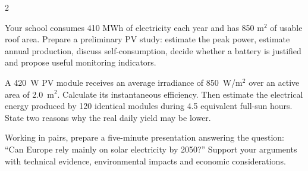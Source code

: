 \begin{multicols}{2}
\begin{challenge}
Your school consumes 410 MWh of electricity each year and has 850 m$^2$ of usable roof area. Prepare a preliminary PV study: estimate the peak power, estimate annual production, discuss self-consumption, decide whether a battery is justified and propose useful monitoring indicators.
\end{challenge}

\begin{applicationexercise}
A 420~W PV module receives an average irradiance of 850~W/m$^2$ over an active area of 2.0~m$^2$. Calculate its instantaneous efficiency. Then estimate the electrical energy produced by 120 identical modules during 4.5 equivalent full-sun hours. State two reasons why the real daily yield may be lower.
\end{applicationexercise}

\begin{speaking}
Working in pairs, prepare a five-minute presentation answering the question: ``Can Europe rely mainly on solar electricity by 2050?'' Support your arguments with technical evidence, environmental impacts and economic considerations.
\end{speaking}

\end{multicols}